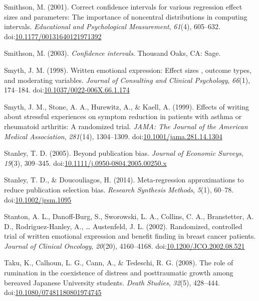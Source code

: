 \documentclass[english,man, mask]{apa6}
\theoremstyle{definition}
\theoremstyle{definition}
\theoremstyle{definition}
\theoremstyle{remark}
\begin{document}
\hypertarget{ref-Smithson2001}{}
Smithson, M. (2001). Correct confidence intervals for various regression
effect sizes and parameters: The importance of noncentral distributions
in computing intervals. \emph{Educational and Psychological
Measurement}, \emph{61}(4), 605--632.
doi:\href{https://doi.org/10.1177/00131640121971392}{10.1177/00131640121971392}

\hypertarget{ref-Smithson2003}{}
Smithson, M. (2003). \emph{Confidence intervals}. Thousand Oaks, CA:
Sage.

\hypertarget{ref-Smyth1998}{}
Smyth, J. M. (1998). Written emotional expression: Effect sizes ,
outcome types, and moderating variables. \emph{Journal of Consulting and
Clinical Psychology}, \emph{66}(1), 174--184.
doi:\href{https://doi.org/10.1037/0022-006X.66.1.174}{10.1037/0022-006X.66.1.174}

\hypertarget{ref-Smyth1999}{}
Smyth, J. M., Stone, A. A., Hurewitz, A., \& Kaell, A. (1999). Effects
of writing about stressful experiences on symptom reduction in patients
with asthma or rheumatoid arthritis: A randomized trial. \emph{JAMA: The
Journal of the American Medical Association}, \emph{281}(14),
1304--1309.
doi:\href{https://doi.org/10.1001/jama.281.14.1304}{10.1001/jama.281.14.1304}

\hypertarget{ref-Stanley2005}{}
Stanley, T. D. (2005). Beyond publication bias. \emph{Journal of
Economic Surveys}, \emph{19}(3), 309--345.
doi:\href{https://doi.org/10.1111/j.0950-0804.2005.00250.x}{10.1111/j.0950-0804.2005.00250.x}

\hypertarget{ref-Stanley2014}{}
Stanley, T. D., \& Doucouliagos, H. (2014). Meta-regression
approximations to reduce publication selection bias. \emph{Research
Synthesis Methods}, \emph{5}(1), 60--78.
doi:\href{https://doi.org/10.1002/jrsm.1095}{10.1002/jrsm.1095}

\hypertarget{ref-Stanton2002}{}
Stanton, A. L., Danoff-Burg, S., Sworowski, L. A., Collins, C. A.,
Branstetter, A. D., Rodriguez-Hanley, A., \ldots{} Austenfeld, J. L.
(2002). Randomized, controlled trial of written emotional expression and
benefit finding in breast cancer patients. \emph{Journal of Clinical
Oncology}, \emph{20}(20), 4160--4168.
doi:\href{https://doi.org/10.1200/JCO.2002.08.521}{10.1200/JCO.2002.08.521}

\hypertarget{ref-Taku2008}{}
Taku, K., Calhoun, L. G., Cann, A., \& Tedeschi, R. G. (2008). The role
of rumination in the coexistence of distress and posttraumatic growth
among bereaved Japanese University students. \emph{Death Studies},
\emph{32}(5), 428--444.
doi:\href{https://doi.org/10.1080/07481180801974745}{10.1080/07481180801974745}
\end{document}
